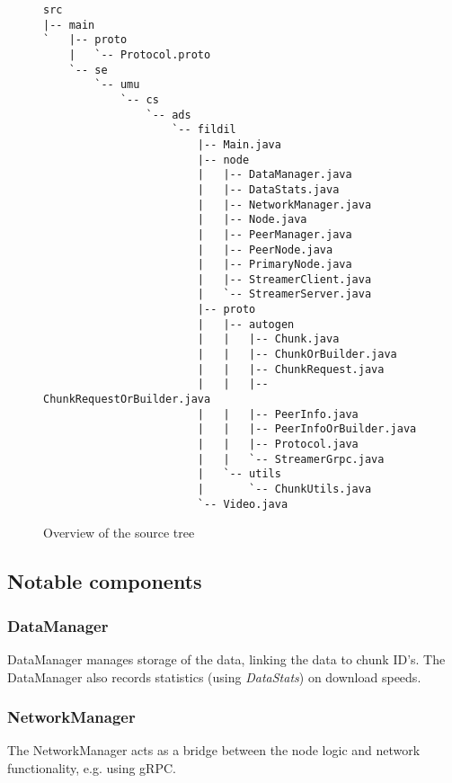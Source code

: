 \documentclass[10pt, a4paper]{article}
\begin{document}
\begin{figure}[H]
\begin{Verbatim}[frame=single]
src
|-- main
`   |-- proto
    |   `-- Protocol.proto
    `-- se
        `-- umu
            `-- cs
                `-- ads
                    `-- fildil
                        |-- Main.java
                        |-- node
                        |   |-- DataManager.java
                        |   |-- DataStats.java
                        |   |-- NetworkManager.java
                        |   |-- Node.java
                        |   |-- PeerManager.java
                        |   |-- PeerNode.java
                        |   |-- PrimaryNode.java
                        |   |-- StreamerClient.java
                        |   `-- StreamerServer.java
                        |-- proto
                        |   |-- autogen
                        |   |   |-- Chunk.java
                        |   |   |-- ChunkOrBuilder.java
                        |   |   |-- ChunkRequest.java
                        |   |   |-- ChunkRequestOrBuilder.java
                        |   |   |-- PeerInfo.java
                        |   |   |-- PeerInfoOrBuilder.java
                        |   |   |-- Protocol.java
                        |   |   `-- StreamerGrpc.java
                        |   `-- utils
                        |       `-- ChunkUtils.java
                        `-- Video.java
\end{Verbatim}
\caption{Overview of the source tree}
\label{fig:src}
\end{figure}

\subsection{Notable components}

\subsubsection*{DataManager}
DataManager manages storage of the data, linking the data to chunk ID's. The
DataManager also records statistics (using \emph{DataStats}) on download speeds.

\subsubsection*{NetworkManager}

The NetworkManager acts as a bridge between the node logic and network
functionality, e.g. using gRPC.
\end{document}
